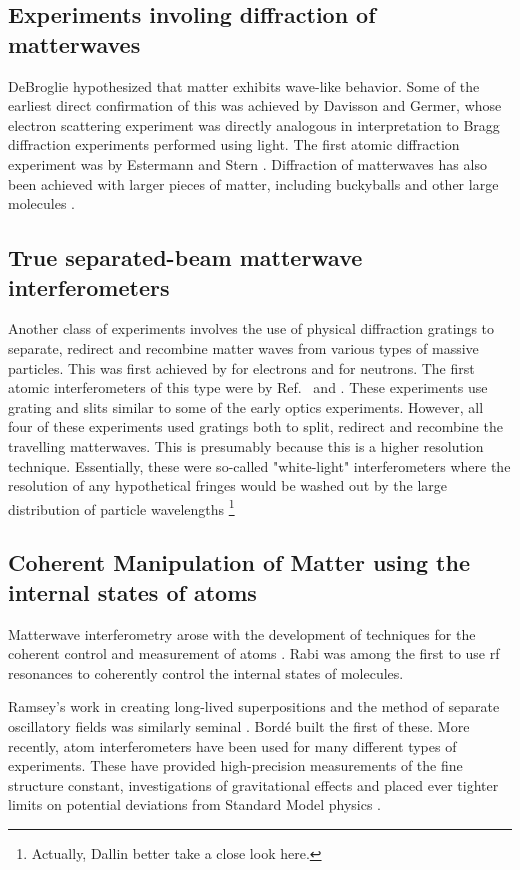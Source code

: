 \subsection{Experiments involing diffraction of matterwaves}
DeBroglie hypothesized that matter exhibits wave-like behavior. Some of the earliest direct confirmation of this was achieved by Davisson and Germer\cite{davisson_and_germer}, whose electron scattering experiment was directly analogous in interpretation to Bragg diffraction experiments performed using light. The first atomic diffraction experiment was by Estermann and Stern \cite{esterman_stern}\cite{Kronin_RMP}. Diffraction of matterwaves has also been achieved with larger pieces of matter, including buckyballs\cite{C60_interferometry} and other large molecules \cite{large_molecule_interferometry}.

\subsection{True separated-beam matterwave interferometers}
Another class of experiments involves the use of physical diffraction gratings to separate, redirect and recombine matter waves from various types of massive particles. This was first achieved by \cite{electronGrating} for electrons and \cite{neutronGrating} for neutrons. The first atomic interferometers of this type were by Ref.~\cite{pritchard1991} and \cite{youngDoubleSlit_Carnal_Mlynek}. These experiments use grating and slits similar to some of the early optics experiments. However, all four of these experiments used gratings both to split, redirect and recombine the travelling matterwaves. This is presumably because this is a higher resolution technique. Essentially, these were so-called "white-light" interferometers where the resolution of any hypothetical fringes would be washed out by the large distribution of particle wavelengths \footnote{Actually, Dallin better take a close look here.} 

\subsection{Coherent Manipulation of Matter using the internal states of atoms}
Matterwave interferometry arose with the development of techniques for the coherent control and measurement of atoms \cite{Kronin_RMP}. Rabi was among the first to use rf resonances to coherently control the internal states of molecules\cite{RabiOriginal}\cite{Kronin_RMP}. 

Ramsey's work in creating long-lived superpositions and the method of separate oscillatory fields was similarly seminal \cite{Kronin_RMP}\cite{Ramsey_original}. 
Bord\'e built \cite{borde_interferometer} the first of these. 
More recently, atom interferometers have been used for many different types of experiments. These have provided high-precision measurements of the fine structure constant, investigations of gravitational effects and placed ever tighter limits on potential deviations from Standard Model physics \cite{Kronin_RMP}.

